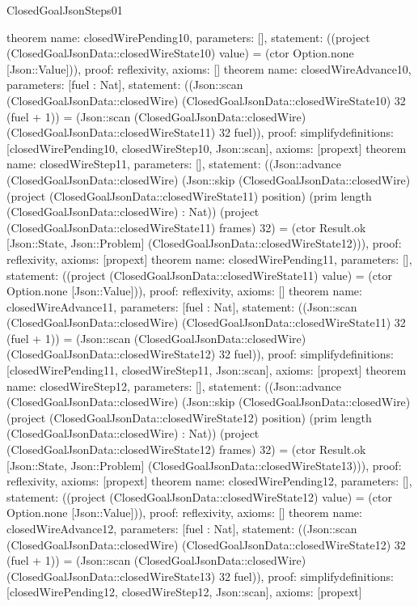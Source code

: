 \begin{lexlean}{ClosedGoalJsonSteps01}
\begin{semanticmodule}
{}
theorem{
 name: closedWirePending10, parameters: [],
 statement: ((project (ClosedGoalJsonData::closedWireState10) value) = (ctor Option.none [Json::Value])), proof: reflexivity{}, axioms: []
}
theorem{
 name: closedWireAdvance10, parameters: [fuel : Nat],
 statement: ((Json::scan (ClosedGoalJsonData::closedWire) (ClosedGoalJsonData::closedWireState10) 32 (fuel + 1)) = (Json::scan (ClosedGoalJsonData::closedWire) (ClosedGoalJsonData::closedWireState11) 32 fuel)), proof: simplify{definitions: [closedWirePending10, closedWireStep10, Json::scan]}, axioms: [propext]
}
theorem{
 name: closedWireStep11, parameters: [],
 statement: ((Json::advance (ClosedGoalJsonData::closedWire) (Json::skip (ClosedGoalJsonData::closedWire) (project (ClosedGoalJsonData::closedWireState11) position) (prim length (ClosedGoalJsonData::closedWire) : Nat)) (project (ClosedGoalJsonData::closedWireState11) frames) 32) = (ctor Result.ok [Json::State, Json::Problem] (ClosedGoalJsonData::closedWireState12))), proof: reflexivity{}, axioms: [propext]
}
theorem{
 name: closedWirePending11, parameters: [],
 statement: ((project (ClosedGoalJsonData::closedWireState11) value) = (ctor Option.none [Json::Value])), proof: reflexivity{}, axioms: []
}
theorem{
 name: closedWireAdvance11, parameters: [fuel : Nat],
 statement: ((Json::scan (ClosedGoalJsonData::closedWire) (ClosedGoalJsonData::closedWireState11) 32 (fuel + 1)) = (Json::scan (ClosedGoalJsonData::closedWire) (ClosedGoalJsonData::closedWireState12) 32 fuel)), proof: simplify{definitions: [closedWirePending11, closedWireStep11, Json::scan]}, axioms: [propext]
}
theorem{
 name: closedWireStep12, parameters: [],
 statement: ((Json::advance (ClosedGoalJsonData::closedWire) (Json::skip (ClosedGoalJsonData::closedWire) (project (ClosedGoalJsonData::closedWireState12) position) (prim length (ClosedGoalJsonData::closedWire) : Nat)) (project (ClosedGoalJsonData::closedWireState12) frames) 32) = (ctor Result.ok [Json::State, Json::Problem] (ClosedGoalJsonData::closedWireState13))), proof: reflexivity{}, axioms: [propext]
}
theorem{
 name: closedWirePending12, parameters: [],
 statement: ((project (ClosedGoalJsonData::closedWireState12) value) = (ctor Option.none [Json::Value])), proof: reflexivity{}, axioms: []
}
theorem{
 name: closedWireAdvance12, parameters: [fuel : Nat],
 statement: ((Json::scan (ClosedGoalJsonData::closedWire) (ClosedGoalJsonData::closedWireState12) 32 (fuel + 1)) = (Json::scan (ClosedGoalJsonData::closedWire) (ClosedGoalJsonData::closedWireState13) 32 fuel)), proof: simplify{definitions: [closedWirePending12, closedWireStep12, Json::scan]}, axioms: [propext]
}
\end{semanticmodule}
\end{lexlean}
